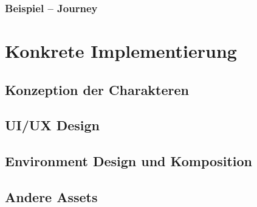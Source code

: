 \subsection{Beispiel – Journey}


\chapter{Konkrete Implementierung}
\label{cha:sa_Einleitung}

\section{Konzeption der Charakteren}

\section{UI/UX Design}

\section{Environment Design und Komposition}

\section{Andere Assets}



